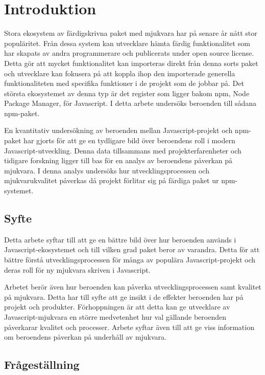 \section{Introduktion}
\label{sec:joel_o-introduction}
Stora ekosystem av färdigskrivna paket med mjukvara har på senare år nått stor populäritet.\cite{Wittern:2016} Från dessa system kan utvecklare hämta färdig funktionalitet som har skapats av andra programmerare och publicerats under open source license. Detta gör att mycket funktionalitet kan importeras direkt från denna sorts paket och utvecklare kan fokusera på att koppla ihop den importerade generella funktionaliteten med specifika funktioner i de projekt som de jobbar på. Det största ekosystemet av denna typ är det register som ligger bakom npm, Node Package Manager, för Javascript.\cite{Decan2018} I detta arbete undersöks beroenden till sådana npm-paket.

En kvantitativ undersökning av beroenden mellan Javascript-projekt och npm-paket har gjorts för att ge en tydligare bild över beroendens roll i modern Javascript-utveckling. Denna data tillsammans med projekterfarenheter och tidigare forskning ligger till bas för en analys av beroendens påverkan på mjukvara. I denna analys undersöks hur utvecklingsprocessen och mjukvarukvalitet påverkas då projekt förlitar sig på färdiga paket ur npm-systemet.

\subsection{Syfte}
Detta arbete syftar till att ge en bättre bild över hur beroenden används i Javascript-ekosystemet och till vilken grad paket beror av varandra. Detta för att bättre förstå utvecklingsprocessen för många av populära Javascript-projekt och deras roll för ny mjukvara skriven i Javascript.

Arbetet berör även hur beroenden kan påverka utvecklingsprocessen samt kvalitet på mjukvara. Detta har till syfte att ge insikt i de effekter beroenden har på projekt och produkter. Förhoppningen är att detta kan ge utvecklare av Javascript-mjukvara en större medvetenhet hur val gällande beroenden påverkarar kvalitet och processer. Arbete syftar även till att ge viss information om beroendens påverkan på underhåll av mjukvara.

\subsection{Frågeställning}
\label{subsec:joel_o-research-questions}

